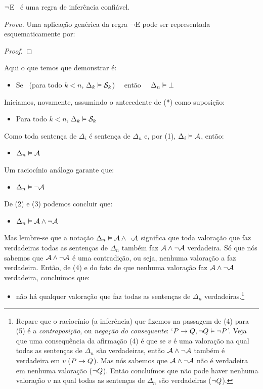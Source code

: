 \begin{factoidboxe}
	$\neg$E \ é uma regra de inferência confiável.
\end{factoidboxe}
\noindent\emph{Prova.}
Uma aplicação genérica da regra $\neg$E pode ser representada esquematicamente por:
\begin{proof}
\end{proof}\noindent
Aqui o que temos que demonstrar é:
\begin{itemize}
	\item[(*)]  Se  \ ({para todo}  $k<n$, $\Delta_k \vDash \mathcal{S}_k$) \ \ então \ \ $\Delta_n \vDash \bot$
\end{itemize}
Iniciamos, novamente, assumindo o antecedente de (*) como suposição:
\begin{itemize}
	\item[(1)] Para todo  $k<n$, $\Delta_k \vDash \mathcal{S}_k$
\end{itemize}
Como toda sentença de $\Delta_i$ é sentença de $\Delta_n$ e, por (1), $\Delta_i \vDash \mathcal{A}$, então:
\begin{itemize}
	\item[(2)] $\Delta_n \vDash \mathcal{A}$
\end{itemize}
Um raciocínio análogo garante que:
\begin{itemize}
	\item[(3)]  $\Delta_n \vDash \neg\mathcal{A}$
\end{itemize}
De (2) e (3) podemos concluir que:
\begin{itemize}
	\item[(4)]  $\Delta_n \vDash \mathcal{A} \wedge \neg\mathcal{A}$ 
\end{itemize}
Mas lembre-se que a notação $\Delta_n \vDash \mathcal{A} \wedge \neg\mathcal{A}$ significa que toda valoração que faz verdadeiras todas as sentenças de $\Delta_n$ também faz $\mathcal{A} \wedge \neg\mathcal{A}$ verdadeira.
Só que nós sabemos que $\mathcal{A} \wedge \neg\mathcal{A}$ é uma contradição, ou seja, nenhuma valoração a faz verdadeira. Então, de (4) e do fato de que nenhuma valoração faz $\mathcal{A} \wedge \neg\mathcal{A}$ verdadeira, concluímos que:
\begin{itemize}
	\item[(5)] não há qualquer valoração que faz todas as sentenças de  $\Delta_n$ verdadeiras.\footnote{
		Repare que o raciocínio (a inferência) que fizemos na passagem de (4) para (5) é a \textit{contraposição}, ou \textit{negação do consequente}: `$P \rightarrow Q, \neg Q \vDash \neg P$'.
		Veja que uma consequência da afirmação (4) é que se $v$ é uma valoração na qual todas as sentenças de $\Delta_n$ são verdadeiras, então  $\mathcal{A} \wedge \neg\mathcal{A}$ também é verdadeira em $v$ ($P \rightarrow Q$).
		Mas nós sabemos que $\mathcal{A} \wedge \neg\mathcal{A}$ não é verdadeira em nenhuma valoração ($\neg Q$).
		Então concluímos que não pode haver nenhuma valoração $v$ na qual todas as sentenças de $\Delta_n$ são verdadeiras ($\neg Q$).}
\end{itemize}
